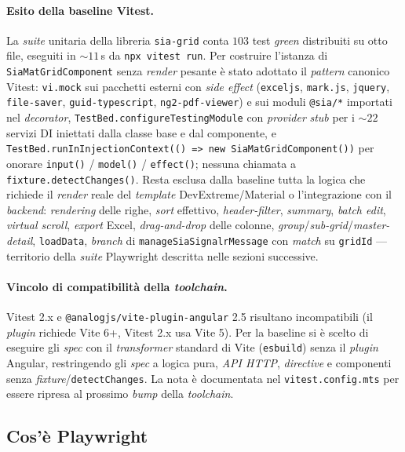 \paragraph{Esito della baseline Vitest.} La \emph{suite} unitaria della libreria \texttt{sia-grid} conta $103$ test \emph{green} distribuiti su otto file, eseguiti in $\sim$$11$\,s da \texttt{npx vitest run}. Per costruire l'istanza di \texttt{SiaMatGridComponent} senza \emph{render} pesante è stato adottato il \emph{pattern} canonico Vitest: \texttt{vi.mock} sui pacchetti esterni con \emph{side effect} (\texttt{exceljs}, \texttt{mark.js}, \texttt{jquery}, \texttt{file-saver}, \texttt{guid-typescript}, \texttt{ng2-pdf-viewer}) e sui moduli \texttt{@sia/*} importati nel \emph{decorator}, \texttt{TestBed.configureTestingModule} con \emph{provider} \emph{stub} per i $\sim$$22$ servizi DI iniettati dalla classe base e dal componente, e \texttt{TestBed.runInInjectionContext(() => new SiaMatGridComponent())} per onorare \texttt{input()} / \texttt{model()} / \texttt{effect()}; nessuna chiamata a \texttt{fixture.detectChanges()}. Resta esclusa dalla baseline tutta la logica che richiede il \emph{render} reale del \emph{template} DevExtreme/Material o l'integrazione con il \emph{backend}: \emph{rendering} delle righe, \emph{sort} effettivo, \emph{header-filter}, \emph{summary}, \emph{batch edit}, \emph{virtual scroll}, \emph{export} Excel, \emph{drag-and-drop} delle colonne, \emph{group}/\emph{sub-grid}/\emph{master-detail}, \texttt{loadData}, \emph{branch} di \texttt{manageSiaSignalrMessage} con \emph{match} su \texttt{gridId} — territorio della \emph{suite} Playwright descritta nelle sezioni successive.

\paragraph{Vincolo di compatibilità della \emph{toolchain}.} Vitest 2.x e \texttt{@analogjs/vite-plugin-angular} 2.5 risultano incompatibili (il \emph{plugin} richiede Vite 6+, Vitest 2.x usa Vite 5). Per la baseline si è scelto di eseguire gli \emph{spec} con il \emph{transformer} standard di Vite (\texttt{esbuild}) senza il \emph{plugin} Angular, restringendo gli \emph{spec} a logica pura, \emph{API HTTP}, \emph{directive} e componenti senza \emph{fixture}/\texttt{detectChanges}. La nota è documentata nel \texttt{vitest.config.mts} per essere ripresa al prossimo \emph{bump} della \emph{toolchain}.

\subsection{Cos'è Playwright}

